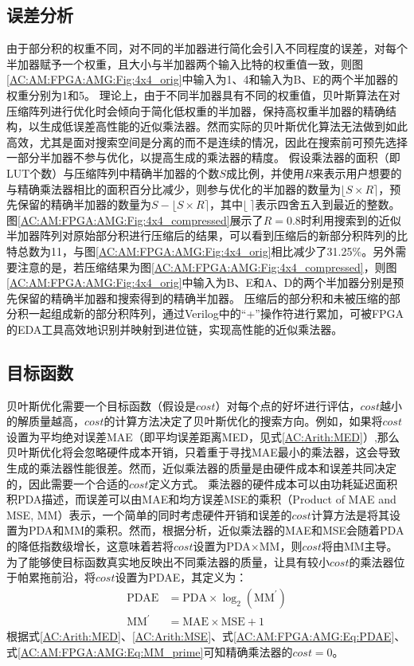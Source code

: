 \subsection{误差分析}

由于部分积的权重不同，对不同的半加器进行简化会引入不同程度的误差，对每个半加器赋予一个权重，且大小与半加器两个输入比特的权重值一致，则图\ref{AC:AM:FPGA:AMG:Fig:4x4_orig}中输入为1、4和输入为B、E的两个半加器的权重分别为1和5。
理论上，由于不同半加器具有不同的权重值，贝叶斯算法在对压缩阵列进行优化时会倾向于简化低权重的半加器，保持高权重半加器的精确结构，以生成低误差高性能的近似乘法器。然而实际的贝叶斯优化算法无法做到如此高效，尤其是面对搜索空间是分离的而不是连续的情况，因此在搜索前可预先选择一部分半加器不参与优化，以提高生成的乘法器的精度。
假设乘法器的面积（即LUT个数）与压缩阵列中精确半加器的个数$S$成比例，并使用$R$来表示用户想要的与精确乘法器相比的面积百分比减少，则参与优化的半加器的数量为$\lfloor S \times R \rceil$，预先保留的精确半加器的数量为$S - \lfloor S \times R \rceil$，其中$\lfloor \ \rceil$表示四舍五入到最近的整数。
图\ref{AC:AM:FPGA:AMG:Fig:4x4_compressed}展示了$R=0.8$时利用搜索到的近似半加器阵列对原始部分积进行压缩后的结果，可以看到压缩后的新部分积阵列的比特总数为11，与图\ref{AC:AM:FPGA:AMG:Fig:4x4_orig}相比减少了31.25\%。另外需要注意的是，若压缩结果为图\ref{AC:AM:FPGA:AMG:Fig:4x4_compressed}，则图\ref{AC:AM:FPGA:AMG:Fig:4x4_orig}中输入为B、E和A、D的两个半加器分别是预先保留的精确半加器和搜索得到的精确半加器。
压缩后的部分积和未被压缩的部分积一起组成新的部分积阵列，通过Verilog中的“+”操作符进行累加，可被FPGA的EDA工具高效地识别并映射到进位链，实现高性能的近似乘法器。

\subsection{目标函数}

贝叶斯优化需要一个目标函数（假设是$cost$）对每个点的好坏进行评估，$cost$越小的解质量越高，$cost$的计算方法决定了贝叶斯优化的搜索方向。例如，如果将$cost$设置为平均绝对误差MAE（即平均误差距离MED，见式\eqref{AC:Arith:MED}）,那么贝叶斯优化将会忽略硬件成本开销，只着重于寻找MAE最小的乘法器，这会导致生成的乘法器性能很差。然而，近似乘法器的质量是由硬件成本和误差共同决定的，因此需要一个合适的$cost$定义方式。
乘法器的硬件成本可以由功耗延迟面积积PDA描述，而误差可以由MAE和均方误差MSE的乘积（Product of MAE and MSE, MM）表示，一个简单的同时考虑硬件开销和误差的$cost$计算方法是将其设置为PDA和MM的乘积。然而，根据分析，近似乘法器的MAE和MSE会随着PDA的降低指数级增长，这意味着若将$cost$设置为PDA$ \times $MM，则$cost$将由MM主导。为了能够使目标函数真实地反映出不同乘法器的质量，让具有较小$cost$的乘法器位于帕累拖前沿，将$cost$设置为PDAE，其定义为：
\begin{align}
    \text{PDAE} & = \text{PDA} \times \log_2 (\text{MM}^{\prime}) \label{AC:AM:FPGA:AMG:Eq:PDAE}  \\
    \text{MM}^{\prime} & = \text{MAE} \times \text{MSE} + 1 \label{AC:AM:FPGA:AMG:Eq:MM_prime}
\end{align}
根据式\eqref{AC:Arith:MED}、\eqref{AC:Arith:MSE}、式\eqref{AC:AM:FPGA:AMG:Eq:PDAE}、式\eqref{AC:AM:FPGA:AMG:Eq:MM_prime}可知精确乘法器的$cost=0$。



